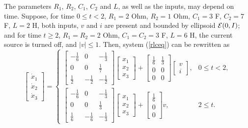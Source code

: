 \documentclass{report}
\newcommand{\EE}{{\cal E}}
\begin{document}
The parameters $R_1$, $R_2$, $C_1$, $C_2$ and $L$, as well as the inputs,
may depend on time. Suppose, for time $0\leq t<2$, $R_1=2$ Ohm, $R_2=1$ Ohm,
$C_1=3$ F, $C_2=7$ F, $L=2$ H, both inputs, $v$ and $i$ are present and
bounded by ellipsoid $\EE(0,I)$; and for time $t\geq 2$,
$R_1=R_2=2$ Ohm, $C_1=C_2=3$ F, $L=6$ H, the current source is turned off,
and $|v|\leq 1$. Then, system (\ref{rlceq}) can be rewritten as
\begin{equation}
\left[\begin{array}{c}
\dot{x}_1\\
\dot{x}_2\\
\dot{x}_3\end{array}\right] = \left\{\begin{array}{ll}
\left[\begin{array}{ccc}
-\frac{1}{6} & 0 & -\frac{1}{3}\\
0 & 0 & \frac{1}{7}\\
\frac{1}{2} & -\frac{1}{2} & -\frac{1}{2}\end{array}\right]
\left[\begin{array}{c}
x_1\\
x_2\\
x_3\end{array}\right] + \left[\begin{array}{cc}
\frac{1}{6} & \frac{1}{3}\\
0 & 0\\
0 & 0\end{array}\right]\left[\begin{array}{c}
v\\
i\end{array}\right], & 0\leq t< 2, \\
\left[\begin{array}{ccc}
-\frac{1}{6} & 0 & -\frac{1}{3}\\
0 & 0 & \frac{1}{3}\\
\frac{1}{6} & -\frac{1}{6} & -\frac{1}{3}\end{array}\right]
\left[\begin{array}{c}
x_1\\
x_2\\
x_3\end{array}\right] + \left[\begin{array}{c}
\frac{1}{6} \\
0 \\
0 \end{array}\right]v, & 2\leq t. \end{array}\right.
\label{rlceq2}
\end{equation}
\end{document}
